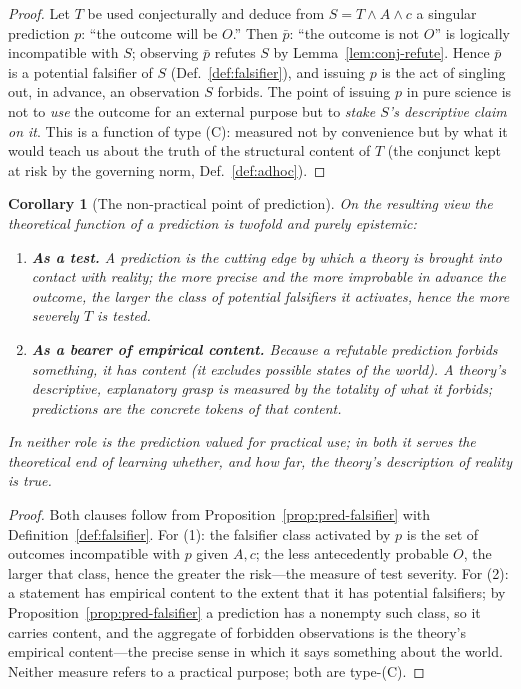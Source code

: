 \documentclass{amsart}
\theoremstyle{definition}
\theoremstyle{plain}
\newtheorem{corollary}{Corollary}
\begin{document}
\begin{proof}
Let $T$ be used conjecturally and deduce from $S=T\wedge A\wedge c$ a singular
prediction $p$: ``the outcome will be $O$.'' Then $\bar p$: ``the outcome is not
$O$'' is logically incompatible with $S$; observing $\bar p$ refutes $S$ by
Lemma~\ref{lem:conj-refute}. Hence $\bar p$ is a potential falsifier of $S$
(Def.~\ref{def:falsifier}), and issuing $p$ is the act of singling out, in
advance, an observation $S$ forbids. The point of issuing $p$ in pure science is
not to \emph{use} the outcome for an external purpose but to \emph{stake $S$'s
descriptive claim on it}. This is a function of type (C): measured not by
convenience but by what it would teach us about the truth of the structural
content of $T$ (the conjunct kept at risk by the governing norm,
Def.~\ref{def:adhoc}).
\end{proof}

\begin{corollary}[The non-practical point of prediction]\label{cor:why-predict}
On the resulting view the theoretical function of a prediction is twofold and
purely epistemic:
\begin{enumerate}
\item \textbf{As a test.} A prediction is the cutting edge by which a theory is
brought into contact with reality; the more precise and the more
\emph{improbable in advance} the outcome, the larger the class of potential
falsifiers it activates, hence the more severely $T$ is tested.
\item \textbf{As a bearer of empirical content.} Because a refutable prediction
\emph{forbids} something, it has content (it excludes possible states of the
world). A theory's descriptive, explanatory grasp is measured by the totality of
what it forbids; predictions are the concrete tokens of that content.
\end{enumerate}
In neither role is the prediction valued for practical use; in both it serves
the theoretical end of learning whether, and how far, the theory's description
of reality is true.
\end{corollary}

\begin{proof}
Both clauses follow from Proposition~\ref{prop:pred-falsifier} with
Definition~\ref{def:falsifier}. For (1): the falsifier class activated by $p$ is
the set of outcomes incompatible with $p$ given $A,c$; the less antecedently
probable $O$, the larger that class, hence the greater the risk---the measure of
test severity. For (2): a statement has empirical content to the extent that it
has potential falsifiers; by Proposition~\ref{prop:pred-falsifier} a prediction
has a nonempty such class, so it carries content, and the aggregate of forbidden
observations is the theory's empirical content---the precise sense in which it
says something about the world. Neither measure refers to a practical purpose;
both are type-(C).
\end{proof}
\end{document}
